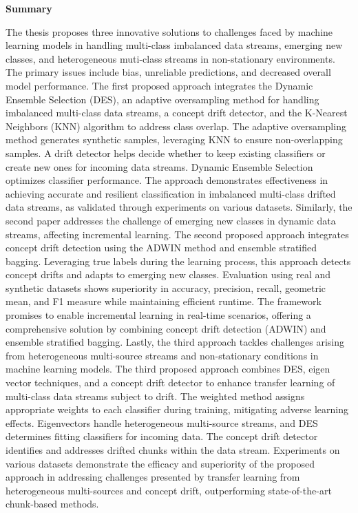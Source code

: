\begin{alwayssingle} \pagestyle{empty}\begin{center}
    \vspace*{1.5cm}
    {\Large \bfseries  Summary}
  \end{center}       %
The thesis proposes three innovative solutions to challenges faced by machine learning models in handling multi-class imbalanced data streams, emerging new classes, and heterogeneous muti-class streams in non-stationary environments. The primary issues include bias, unreliable predictions, and decreased overall model performance.
The first proposed approach integrates the Dynamic Ensemble Selection (DES), an adaptive oversampling method for handling imbalanced multi-class data streams, a concept drift detector, and the K-Nearest Neighbors (KNN) algorithm to address class overlap. The adaptive oversampling method generates synthetic samples, leveraging KNN to ensure non-overlapping samples. A drift detector helps decide whether to keep existing classifiers or create new ones for incoming data streams. Dynamic Ensemble Selection optimizes classifier performance. The approach demonstrates effectiveness in achieving accurate and resilient classification in imbalanced multi-class drifted data streams, as validated through experiments on various datasets.
Similarly, the second paper addresses the challenge of emerging new classes in dynamic data streams, affecting incremental learning. The second proposed approach integrates concept drift detection using the ADWIN method and ensemble stratified bagging. Leveraging true labels during the learning process, this approach detects concept drifts and adapts to emerging new classes. Evaluation using real and synthetic datasets shows superiority in accuracy, precision, recall, geometric mean, and F1 measure while maintaining efficient runtime. The framework promises to enable incremental learning in real-time scenarios, offering a comprehensive solution by combining concept drift detection (ADWIN) and ensemble stratified bagging.
Lastly, the third approach tackles challenges arising from heterogeneous multi-source streams and non-stationary conditions in machine learning models. The third proposed approach combines DES, eigen vector techniques, and a concept drift detector to enhance transfer learning of multi-class data streams subject to drift. The weighted method assigns appropriate weights to each classifier during training, mitigating adverse learning effects. Eigenvectors handle heterogeneous multi-source streams, and DES determines fitting classifiers for incoming data. The concept drift detector identifies and addresses drifted chunks within the data stream. Experiments on various datasets demonstrate the efficacy and superiority of the proposed approach in addressing challenges presented by transfer learning from heterogeneous multi-sources and concept drift, outperforming state-of-the-art chunk-based methods.

\end{alwayssingle}


